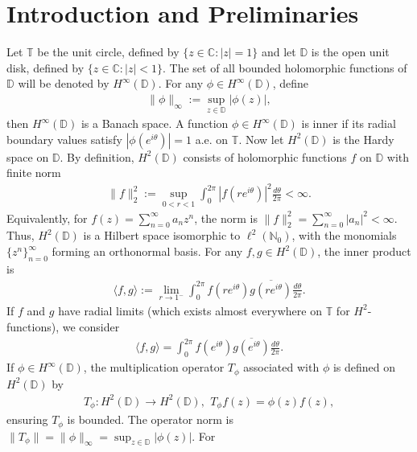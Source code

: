 \documentclass[12pt,titlepage]{amsart}
\theoremstyle{definition}
\theoremstyle{remark}
\begin{document}
\section{\textbf{Introduction and Preliminaries}}\label{Sec1}
Let $\mathbb{T}$ be the unit circle, defined by $\{z \in
\mathbb{C}: |z|=1\}$ and let $\mathbb{D}$ is the open unit disk,
defined by $\{z \in \mathbb{C}: |z|<1\}$. The set of all bounded
holomorphic functions of $\mathbb{D}$ will be denoted by
$H^{\infty}(\mathbb{D})$. For any $\phi \in
H^{\infty}(\mathbb{D})$, define
\begin{eqnarray}
\|\phi\|_{\infty}:=\sup_{z \in \mathbb{D}}|\phi(z)|,
\end{eqnarray}
then $H^{\infty}(\mathbb{D})$ is a Banach space. A function $\phi
\in H^{\infty}(\mathbb{D})$ is inner if its radial boundary values
satisfy $|\phi(e^{i\theta})|=1$ a.e. on $\mathbb{T}$. Now let
$H^2(\mathbb{D})$ is the Hardy space on $\mathbb{D}$. By
definition, $H^2(\mathbb{D})$ consists of holomorphic functions
$f$ on $\mathbb{D}$ with finite norm
\begin{eqnarray}
\| f \|_{2}^2 := \sup_{0 < r < 1} \int_0^{2\pi} |f(r
e^{i\theta})|^2 \frac{d\theta}{2\pi} < \infty.
\end{eqnarray}
Equivalently, for $f(z) = \sum_{n=0}^\infty a_n z^n$, the norm is
$\|f\|_{2}^2 = \sum_{n=0}^\infty |a_n|^2 < \infty$. Thus,
$H^2(\mathbb{D})$ is a Hilbert space isomorphic to
$\ell^2(\mathbb{N}_0)$, with the monomials $\{z^n\}_{n=0}^\infty$
forming an orthonormal basis. For any $f,g \in H^2(\mathbb{D})$,
the inner product is
\begin{eqnarray}
\langle f, g \rangle := \lim_{r \to 1^-} \int_0^{2\pi} f(r
e^{i\theta}) \overline{g(r e^{i\theta})} \frac{d\theta}{2\pi}.
\end{eqnarray}
If $f$ and $g$ have radial limits (which exists almost everywhere
on $\mathbb{T}$ for $H^2$-functions), we consider
\begin{eqnarray}
\langle f, g \rangle =\int_0^{2\pi} f( e^{i\theta}) \overline{g(
e^{i\theta})} \frac{d\theta}{2\pi}.
\end{eqnarray}
If $\phi \in H^{\infty}(\mathbb{D})$, the multiplication operator
$T_{\phi}$ associated with $\phi$ is defined on $H^2(\mathbb{D})$
by
\begin{eqnarray*}
T_\phi:H^2(\mathbb{D}) \to H^2(\mathbb{D}), \,\ T_\phi
f(z)=\phi(z) f(z),
\end{eqnarray*}
ensuring $T_\phi$ is bounded. The operator norm is $\| T_\phi \| =
\| \phi \|_{\infty} = \sup_{z \in \mathbb{D}} |\phi(z)|$. For
\end{document}
